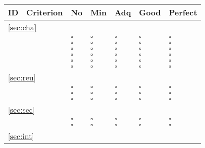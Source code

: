 \documentclass[a4paper,11pt]{article}
\begin{document}
\begin{table}[hbt]
	\begin{tabular}
		{ p{} | 
		  p{} |
		  p{} |
		  p{} |
		  p{} |
		  p{} |
		  p{} }
        \hline
		\textbf{ID} & \textbf{Criterion} & \textbf{No} & \textbf{Min} & \textbf{Adq} & \textbf{Good} & \textbf{Perfect} \\
        \hline 
		\multicolumn{7}{l}{\ref{sec:cha}{ }\nameref{sec:cha}} \\
		\hline	
		\hyperref[id:ch1]{\chOneID} & \chOneText & $\square$ & $\square$ & $\square$ & $\square$ & $\square$ \\
		\hyperref[id:ch2]{\chTwoID} & \chTwoText & $\square$ & $\square$ & $\square$ & $\square$ & $\square$ \\
		\hyperref[id:ch3]{\chThreeID} & \chThreeText & $\square$ & $\square$ & $\square$ & $\square$ & $\square$ \\
		\hyperref[id:ch4]{\chFourID} & \chFourText & $\square$ & $\square$ & $\square$ & $\square$ & $\square$ \\
		\hyperref[id:ch5]{\chFiveID} & \chFiveText & $\square$ & $\square$ & $\square$ & $\square$ & $\square$ \\
		\hyperref[id:ch6]{\chSixID} & \chSixText & $\square$ & $\square$ & $\square$ & $\square$ & $\square$ \\
		\hline
        \multicolumn{7}{l}{\ref{sec:reu}{ }\nameref{sec:reu}} \\
		\hline	
		\hyperref[id:r1]{\rOneID} & \rOneText & $\square$ & $\square$ & $\square$ & $\square$ & $\square$ \\
		\hyperref[id:r2]{\rTwoID} & \rTwoText & $\square$ & $\square$ & $\square$ & $\square$ & $\square$ \\
		\hyperref[id:r3]{\rThreeID} & \rThreeText & $\square$ & $\square$ & $\square$ & $\square$ & $\square$ \\
		\hline
		\multicolumn{7}{l}{\ref{sec:sec}{ }\nameref{sec:sec}} \\
		\hline	
		\hyperref[id:sc1]{\scOneID} & \scOneText & $\square$ & $\square$ & $\square$ & $\square$ & $\square$ \\
		\hyperref[id:sc2]{\scTwoID} & \scTwoText & $\square$ & $\square$ & $\square$ & $\square$ & $\square$ \\
		\hline
		\multicolumn{7}{l}{\ref{sec:int}{ }\nameref{sec:int}} \\

\end{tabular}
\end{table}
\end{document}
